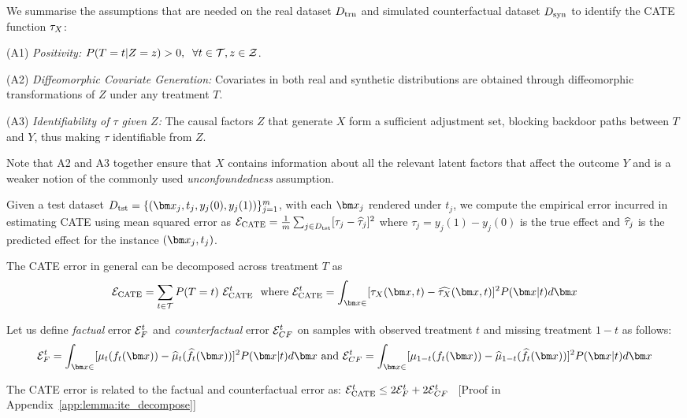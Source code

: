 We summarise the assumptions that are needed on the real dataset $D_{\text{trn}}$ and simulated counterfactual dataset $D_{\text{syn}}$ to identify the CATE function $\tau_X$:
\begin{enumerate*}%
    \item[(A1)] \textit{Positivity:} $P(T=t| Z=z) > 0, \;\; \forall t  \in \mathcal{T}, z \in \mathcal{Z}$.
    \item[(A2)] \textit{Diffeomorphic Covariate Generation:} Covariates in both real and synthetic distributions are obtained through diffeomorphic transformations of $Z$ under any treatment $T$.
    \item[(A3)] \textit{Identifiability of $\tau$ given $Z$:}  The causal factors $Z$ that generate $X$ form a sufficient adjustment set, blocking backdoor paths between $T$ and $Y$, thus making $\tau$ identifiable from $Z$. 
\end{enumerate*}
%
Note that A2 and A3 together ensure that $X$ contains information about all the relevant latent factors that affect the outcome $Y$ and 
is a weaker notion of 
the commonly used \textit{unconfoundedness} assumption.


Given a test dataset $\tstD = \{(\xb_j, t_j, y_j(0), y_j(1))\}_{j=1}^m$, with each $\xb_j$ rendered under $t_j$, we compute the empirical error incurred in estimating CATE using mean squared error as
$
    \mathcal{E}_{\text{CATE}} = \frac{1}{m}\sum_{j \in D_{\text{tst}}} [\tau_j - \widehat{\tau}_j]^2  \label{eq:ite_error}   
$
where $\tau_j = y_j(1) - y_j(0)$ is the true effect and $\widehat{\tau}_j$ is the predicted effect for the instance $(\xb_j, t_j)$.  

The CATE error in general can be decomposed across treatment $T$ as
$$
    \ErrITE 
    = \sum_{t \in \Tspace} P(T=t) ~ \ErrITE^t~~
    \text{where }\ErrITE^t = \int_{\xb \in \xspace} [\ITEx(\xb, t) - \ITExhat(\xb, t)]^2 P(\xb|t)d\xb
$$

 Let us define \textit{factual} error $\mathcal{E}_F^t$ and \textit{counterfactual} error $\mathcal{E}_{CF}^t$ on samples with observed treatment $t$ and missing treatment $1- t$ as follows:
\begin{align*}
    \ErrF^t = \int_{\xb \in \xspace} [\realmu_t(\RInv_t(\xb)) - \realmuhat_t(\RInvhat_t(\xb))]^2 P(\xb|t)d\xb \text{ and }
    \ErrCF^t = \int_{\xb \in \xspace} [\realmu_{1-t}(\RInv_t(\xb)) - \realmuhat_{1-t}(\RInvhat_t(\xb))]^2 P(\xb|t)d\xb
\end{align*}
%
\newcommand{\lemmaitedecompose}{The CATE error is related to the factual and counterfactual error as:
    $
        \ErrITE^t \leq 2 \ErrF^t + 2\ErrCF^t
    $}
\begin{lemma}
\label{lemma:ite_decompose}
    \lemmaitedecompose\
    [Proof in Appendix~\ref{app:lemma:ite_decompose}]
\end{lemma}

